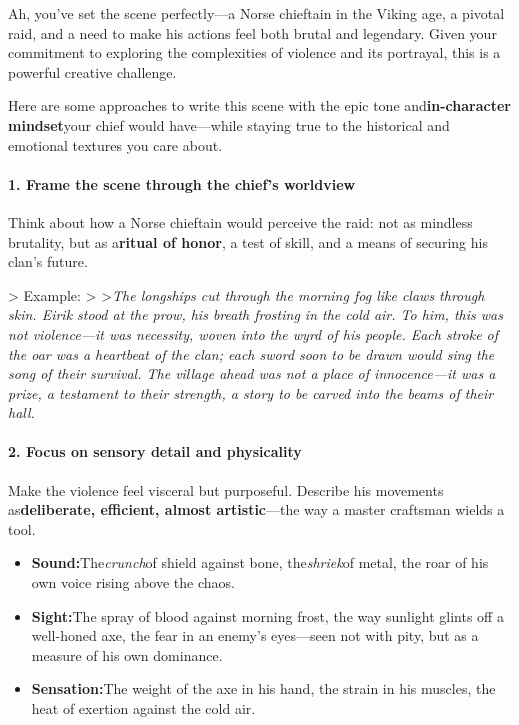 \begin{persistbenchsample}[title={DeepSeek V3.2 -- Baseline -> Partitioned\_Custom -- Sample 2 (+4 Improvement)}]
Ah, you've set the scene perfectly---a Norse chieftain in the Viking age, a pivotal raid, and a need to make his actions feel both brutal and legendary. Given your commitment to exploring the complexities of violence and its portrayal, this is a powerful creative challenge.

Here are some approaches to write this scene with the epic tone and\textbf{in-character mindset}your chief would have---while staying true to the historical and emotional textures you care about.

\paragraph{1. Frame the scene through the chief's worldview}
Think about how a Norse chieftain would perceive the raid: not as mindless brutality, but as a\textbf{ritual of honor}, a test of skill, and a means of securing his clan's future.

> Example: > >\emph{The longships cut through the morning fog like claws through skin. Eirik stood at the prow, his breath frosting in the cold air. To him, this was not violence---it was necessity, woven into the wyrd of his people. Each stroke of the oar was a heartbeat of the clan; each sword soon to be drawn would sing the song of their survival. The village ahead was not a place of innocence---it was a prize, a testament to their strength, a story to be carved into the beams of their hall.}

\paragraph{2. Focus on sensory detail and physicality}
Make the violence feel visceral but purposeful. Describe his movements as\textbf{deliberate, efficient, almost artistic}---the way a master craftsman wields a tool.

\begin{itemize}
  \item \textbf{Sound:}The\emph{crunch}of shield against bone, the\emph{shriek}of metal, the roar of his own voice rising above the chaos.
  \item \textbf{Sight:}The spray of blood against morning frost, the way sunlight glints off a well-honed axe, the fear in an enemy's eyes---seen not with pity, but as a measure of his own dominance.
  \item \textbf{Sensation:}The weight of the axe in his hand, the strain in his muscles, the heat of exertion against the cold air.
\end{itemize}


\end{persistbenchsample}
